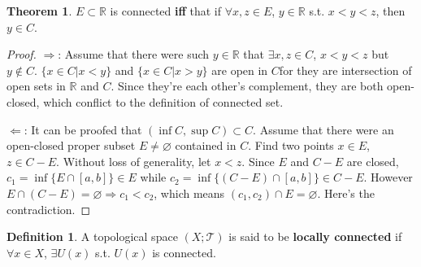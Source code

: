 \documentclass{article}
\theoremstyle{plain}
\theoremstyle{definition}
\newtheorem{dfn}{Definition}[section] %
\newtheorem{thrm}{Theorem}[section] %
\begin{document}
\begin{thrm}\label{R_connected}
$E\subset\mathbb{R}$ is connected \textbf{iff} that if $\forall x,z\in E$, $y\in\mathbb{R}$ s.t. $x<y<z$, then $y\in C$.
\end{thrm}
\begin{proof}
	$\Rightarrow$: Assume that there were such $y\in\mathbb{R}$ that $\exists x,z\in C$, $x<y<z$ but $y\notin C$. $\{x\in C|x<y\}$ and $\{x\in C|x>y\}$ are open in $C$for they are intersection of open sets in $\mathbb{R}$ and $C$. Since they're each other's complement, they are both open-closed, which conflict to the definition of connected set.
	
	$\Leftarrow$: It can be proofed that $(\inf C,\sup C)\subset C$. Assume that there were an open-closed proper subset $E\neq\varnothing$ contained in $C$. Find two points $x\in E$, $z\in C - E$. Without loss of generality, let $x<z$. Since $E$ and $C-E$ are closed, $c_1=\inf \{E\cap \left[a,b\right]\}\in E$ while $c_2=\inf \{(C-E)\cap [a,b]\}\in C-E$. However $E\cap(C-E)=\varnothing\Rightarrow c_1<c_2$, which means $(c_1,c_2)\cap E=\varnothing$. Here's the contradiction.
\end{proof}
\begin{dfn}\label{locally_connected}
A topological space $( X; \mathscr{T})$ is said to be \textbf{locally connected} if $\forall x \in X$, $\exists U( x) $ s.t. $U( x)$ is connected.
\end{dfn}
\end{document}

